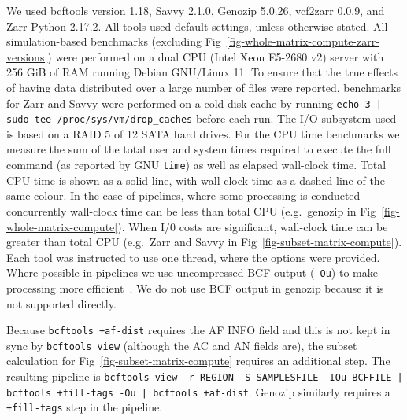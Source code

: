 \documentclass[a4paper,num-refs]{oup-contemporary}
\begin{document}
We used bcftools version 1.18, Savvy 2.1.0, Genozip 5.0.26,
vcf2zarr 0.0.9, and Zarr-Python 2.17.2.
All tools used default settings,
unless otherwise stated.
All simulation-based benchmarks (excluding Fig~\ref{fig-whole-matrix-compute-zarr-versions}) were performed on a
dual CPU (Intel Xeon E5-2680 v2)
server with 256 GiB of RAM running Debian GNU/Linux 11.
To ensure that the true effects of having data distributed over a large
number of files were reported, benchmarks for Zarr and Savvy were
performed on a cold disk cache by running
\texttt{echo 3 | sudo tee /proc/sys/vm/drop\_caches} before each run.
The I/O subsystem used is based on a RAID 5 of 12 SATA hard drives.
For the CPU time benchmarks we measure the sum of the total user and
system times required to execute the full command (as reported by GNU
\texttt{time}) as well as elapsed wall-clock time. Total CPU
time is shown as a solid line, with wall-clock time as a dashed line
of the same colour. In the case of pipelines, where some processing
is conducted concurrently wall-clock time can be less than total
CPU (e.g.\ genozip in Fig~\ref{fig-whole-matrix-compute}).
When I/0 costs are significant, wall-clock time can be greater
than total CPU (e.g.\ Zarr and Savvy in Fig~\ref{fig-subset-matrix-compute}).
Each tool was instructed to use one thread, where the options
were provided.
Where possible in pipelines we use uncompressed BCF
output (\texttt{-Ou}) to make processing
more efficient~\citep{danecek2021twelve}.
We do not use BCF output in genozip because it is not supported
directly.

Because \texttt{bcftools +af-dist} requires the AF INFO field
and this is not kept in sync by \texttt{bcftools view}
(although the AC and AN fields are), the subset calculation
for Fig~\ref{fig-subset-matrix-compute} requires an additional step.
The resulting pipeline is
\texttt{bcftools view -r REGION -S SAMPLESFILE -IOu BCFFILE |
bcftools +fill-tags -Ou | bcftools +af-dist}. Genozip similarly
requires a \texttt{+fill-tags} step in the pipeline.
\end{document}
